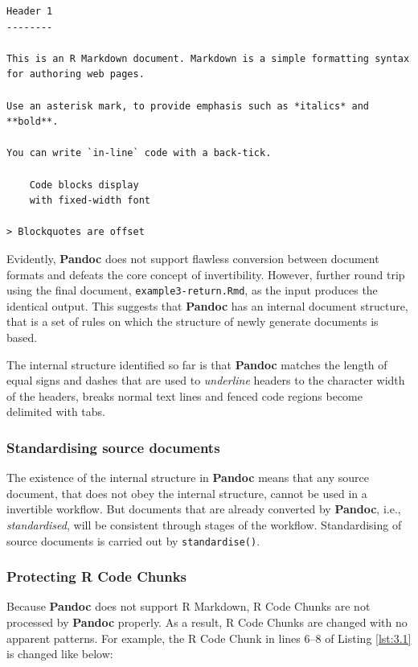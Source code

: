 \documentclass[a4paper, 12pt]{report}
\begin{document}
\begin{lstlisting}[caption={\texttt{example3-return.Rmd}}, escapechar=\|, label={lst:3.4}]
Header 1
--------

This is an R Markdown document. Markdown is a simple formatting syntax
for authoring web pages.

Use an asterisk mark, to provide emphasis such as *italics* and
**bold**.

You can write `in-line` code with a back-tick.

    Code blocks display
    with fixed-width font

> Blockquotes are offset
\end{lstlisting}

Evidently, \textbf{Pandoc} does not support flawless conversion between document formats and defeats the core concept of invertibility. However, further round trip using the final document, \texttt{example3-return.Rmd}, as the input produces the identical output. This suggests that \textbf{Pandoc} has an internal document structure, that is a set of rules on which the structure of newly generate documents is based.

The internal structure identified so far is that \textbf{Pandoc} matches the length of equal signs and dashes that are used to \emph{underline} headers to the character width of the headers, breaks normal text lines and fenced code regions become delimited with tabs.

\subsubsection*{Standardising source documents}
The existence of the internal structure in \textbf{Pandoc} means that any source document, that does not obey the internal structure, cannot be used in a invertible workflow. But documents that are already converted by \textbf{Pandoc}, i.e., \emph{standardised}, will be consistent through stages of the workflow. Standardising of source documents is carried out by \texttt{standardise()}.

\subsubsection*{Protecting R Code Chunks}
Because \textbf{Pandoc} does not support R Markdown, R Code Chunks are not processed by \textbf{Pandoc} properly. As a result, R Code Chunks are changed with no apparent patterns. For example, the R Code Chunk in lines 6--8 of Listing \ref{lst:3.1} is changed like below:
\end{document}

